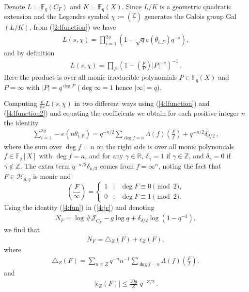 \documentclass[12pt]{amsart}
\theoremstyle{plain}
\newcommand{\Z}{{\mathbb Z}}
\newcommand{\R}{{\mathbb R}}
\newcommand{\F}{{\mathbb F}_q}
\newcommand{\J}{\mathcal J}
\newcommand{\HH}{{\mathcal H}}
\newcommand{\ud}{\mathrm{d}}
\begin{document}
Denote $L=\F(C_F)$ and $K=\F(X)$. Since $L/K$ is a geometric quadratic extension and the Legendre symbol $ \chi:=\left(\frac{F}{\cdot}\right)$ generates the Galois group Gal$(L/K)$, from (\ref{2:lfunction}) we have \begin{eqnarray} \label{4:lfunction} L\left(s,\chi\right)=\prod_{i=1}^{2g} \left(1-\sqrt{q}e\left(\theta_{i,F}\right) q^{-s}\right),\end{eqnarray}
and by definition
\begin{eqnarray} \label{4:lfunction2} L(s,\chi)=\prod_{P} \left(1-\left(\frac{F}{P}\right)|P|^{-s}\right)^{-1}\,. \end{eqnarray}
Here the product is over all monic irreducible polynomials $P \in \F(X)$ and $P=\infty$ with $|P|=q^{\deg P}$ ($\deg \infty=1$ hence $|\infty|=q$).

Computing $\frac{\ud}{\ud s} L(s,\chi)$ in two different ways using (\ref{4:lfunction}) and (\ref{4:lfunction2}) and equating the coefficients we obtain for each positive integer $n$ the identity
\begin{eqnarray} \label{4:fun} \sum_{i=1}^{2g}-e\left(n \theta_{i,F}\right)=q^{-n/2}\sum_{\deg f=n}\Lambda(f) \left(\frac{F}{f}\right)+q^{-n/2} \delta_{d/2}\,,\end{eqnarray}
where the sum over $\deg f=n$ on the right side is over all monic polynomials $f \in \F[X]$ with $\deg f=n$, and for any $\gamma \in \R$, $\delta_{\gamma}=1$ if $\gamma \in \Z$, and $\delta_{\gamma}=0$ if $\gamma \not \in \Z$. The extra term $q^{-n/2}\delta_{n/2}$ comes from $f=\infty^n$, noting the fact that $F \in \HH_{d,q}$ is monic and
\[\left(\frac{F}{\infty}\right)=\left\{\begin{array}{ccc}1&:& \deg F \equiv 0 \pmod{2}, \\
0&:& \deg F \equiv 1 \pmod{2}. \end{array}\right.\]
Using the identity (\ref{4:fun}) in (\ref{4:jc}) and denoting
\begin{eqnarray*} N_F=\log \# \J_{C_F}-g \log q+\delta_{d/2} \log \left(1-q^{-1}\right),\end{eqnarray*}
we find that
\begin{eqnarray*} N_F=\triangle_Z(F)+\epsilon_Z(F),\end{eqnarray*}
where
\begin{eqnarray} \label{4:tri}
\triangle_Z(F)=\sum_{n \le Z}q^{-n} n^{-1} \sum_{\deg f=n} \Lambda(f) \left(\frac{F}{f}\right),
\end{eqnarray}
and
\begin{eqnarray} \label{4:e}
|\epsilon_Z(F)| \le \frac{10g}{Z} \,\, q^{-Z/2}\,.
\end{eqnarray}
\end{document}
